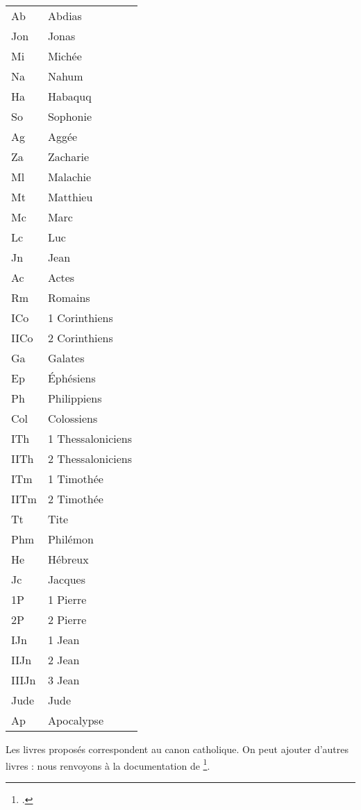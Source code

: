 \begin{longtable}{|l|l|}
Ab    &    Abdias\\
Jon    &    Jonas\\
Mi    &    Michée\\
Na    &    Nahum\\
Ha    &    Habaquq\\
So    &    Sophonie\\
Ag    &    Aggée\\
Za    &    Zacharie\\
Ml    &    Malachie\\
Mt    &    Matthieu\\
Mc    &    Marc\\
Lc    &    Luc\\
Jn    &    Jean\\
Ac    &    Actes\\
Rm    &    Romains\\
ICo    &    1 Corinthiens\\
IICo    &    2 Corinthiens\\
Ga    &    Galates\\
Ep    &    Éphésiens\\
Ph    &    Philippiens\\
Col    &    Colossiens\\
ITh    &    1 Thessaloniciens\\
IITh    &    2 Thessaloniciens\\
ITm    &    1 Timothée\\
IITm    &    2 Timothée\\
Tt    &    Tite\\
Phm    &    Philémon\\
He    &    Hébreux\\
Jc    &    Jacques\\
1P    &    1 Pierre\\
2P    &    2 Pierre\\
IJn    &    1 Jean\\
IIJn    &    2 Jean\\
IIIJn    &    3 Jean\\
Jude    &    Jude\\
Ap    &    Apocalypse\\
\end{longtable}

\begin{plusloins}
Les livres proposés correspondent au canon catholique. On peut ajouter d'autres livres : nous renvoyons à la documentation de \footcite{bibleref_nouveauxlivres}.


\end{plusloins}

